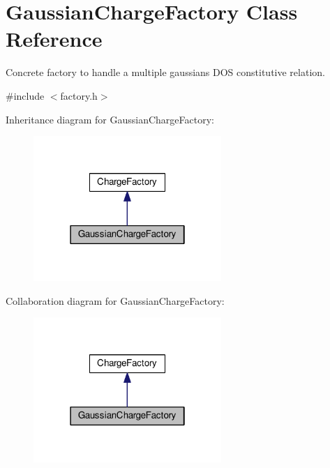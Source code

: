 \hypertarget{classGaussianChargeFactory}{\section{Gaussian\-Charge\-Factory Class Reference}
\label{classGaussianChargeFactory}
}


Concrete factory to handle a multiple gaussians D\-O\-S constitutive relation.  




{\ttfamily \#include $<$factory.\-h$>$}



Inheritance diagram for Gaussian\-Charge\-Factory\-:\nopagebreak
\begin{figure}[H]
\begin{center}
\leavevmode
\includegraphics[width=202pt]{classGaussianChargeFactory__inherit__graph}
\end{center}
\end{figure}


Collaboration diagram for Gaussian\-Charge\-Factory\-:\nopagebreak
\begin{figure}[H]
\begin{center}
\leavevmode
\includegraphics[width=202pt]{classGaussianChargeFactory__coll__graph}
\end{center}
\end{figure}
